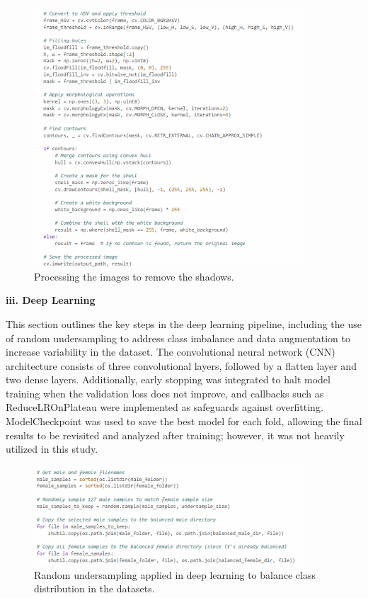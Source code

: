 \begin{figure}[!htbp]
	\centering
	\includegraphics[width=0.9\textwidth, angle=0]{figures/shadow_remove.png}
	\caption{Processing the images to remove the shadows.}
\end{figure}

\newpage

\noindent\textbf{iii. Deep Learning}
\vspace{-0.5cm}

This section outlines the key steps in the deep learning pipeline, including the use of random undersampling to address class imbalance and data augmentation to increase variability in the dataset. The convolutional neural network (CNN) architecture consists of three convolutional layers, followed by a flatten layer and two dense layers. Additionally, early stopping was integrated to halt model training when the validation loss does not improve, and callbacks such as ReduceLROnPlateau were implemented as safeguards against overfitting. ModelCheckpoint was used to save the best model for each fold, allowing the final results to be revisited and analyzed after training; however, it was not heavily utilized in this study.


\begin{figure}[!htbp]
	\centering
	\includegraphics[width=0.9\textwidth, angle=0]{figures/random_undersampling_DL.png}
	\caption{Random undersampling applied in deep learning to balance class distribution in the datasets.}
\end{figure}

